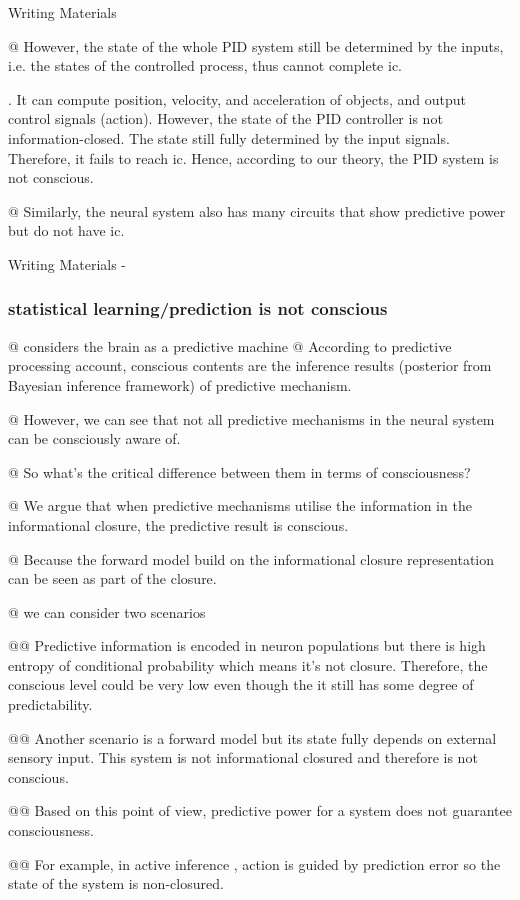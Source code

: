 \documentclass[utf8]{article}
\newenvironment{ants}
			{
			 \begin{easylist}[itemize]
		 	}
			{
			\end{easylist}
			} %
\newenvironment{WritingMaterials} %
    	{
            \begin{tcolorbox}[enhanced,
                title=-,
                size=small,
                colbacktitle=Aquamarine,
                drop fuzzy shadow,
                fontupper=\small,
                boxrule=0.4pt,
                colback=Aquamarine!10!white,
                sharp corners]
                Writing Materials
            \end{tcolorbox}
            \begin{easylist}[itemize]
    	}
    	{
            \end{easylist}  
            \begin{tcolorbox}[enhanced,
                halign=flush right,
                halign title=right,
                size=small,
                colbacktitle=Aquamarine,
                drop fuzzy shadow,
                fontupper=\small,
                boxrule=0.4pt,
                colback=Aquamarine,
                colupper=White,
                sharp corners]
                Writing Materials -
            \end{tcolorbox}        
    	}
\newcommand{\needref}[1]{%
			\ifthenelse{\equal{#1}{}}{%
				\todo[color=White, linecolor=Orange, bordercolor=Orange]{\textcolor{Orange}{Ref}}}{%
				\todo[color=White, linecolor=Orange, bordercolor=Orange]{\textcolor{Orange}{Ref: #1}}%
			}%
		}
\newcommand{\critical}[1]{%
			\todo[color=OrangeRed!80!white]{#1}
		}
\begin{document}
\begin{WritingMaterials}
				@ However, the state of the whole PID system still be determined by the inputs, i.e. the states of the controlled process, thus cannot complete \acl{ic}.

				. It can compute position, velocity, and acceleration of objects, and output control signals (action). However, the state of the PID controller is not information-closed. The state still fully determined by the input signals. Therefore, it fails to reach \ac{ic}. Hence, according to our theory, the PID system is not conscious.

				@ Similarly, the neural system also has many circuits that show predictive power but do not have \ac{ic}.

			\end{WritingMaterials}


			\subsubsection{statistical learning/prediction is not conscious}
				\begin{ants}
					@ considers the brain as a predictive machine
					@ According to predictive processing account, conscious contents are the inference results (posterior from Bayesian inference framework) of predictive mechanism.

					@ However, we can see that not all predictive mechanisms in the neural system can be consciously aware of.

					@ So what's the critical difference between them in terms of consciousness?

					@ We argue that when predictive mechanisms utilise the information in the informational closure, the predictive result is conscious.

					@ Because the forward model build on the informational closure representation can be seen as part of the closure. \critical{IS THIS TRUE? NEED DISCUSSION}


					@ we can consider two scenarios

						@@ Predictive information is encoded in neuron populations but there is high entropy of conditional probability which means it's not closure. Therefore, the conscious level could be very low even though the it still has some degree of predictability.

						@@ Another scenario is a forward model but its state fully depends on external sensory input. This system is not informational closured and therefore is not conscious.

						@@ Based on this point of view, predictive power for a system does not guarantee consciousness.

						@@ For example, in active inference \needref{active inference}, action is guided by prediction error so the state of the system is non-closured.

				\end{ants}
\end{document}
